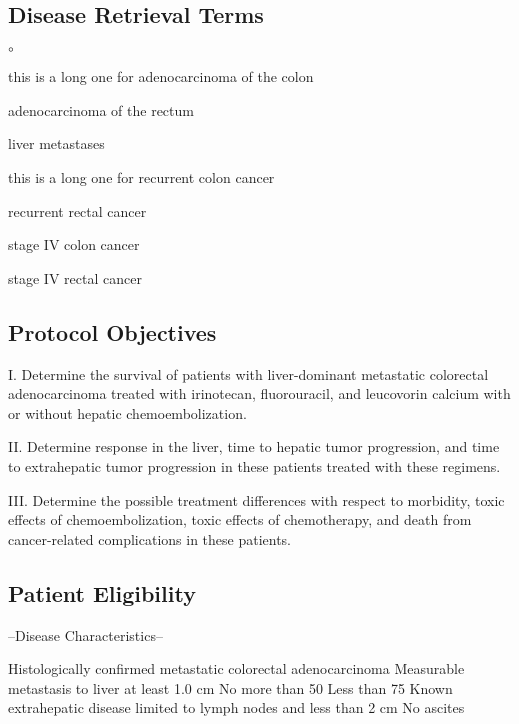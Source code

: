 \documentclass[12pt]{article}
\newcounter{qC}
\begin{document}
\setcounter{qC}{0}
\subsection*{Disease Retrieval Terms}
\begin{list}{$\circ$}{\setlength{\itemsep}{-5pt}}
\item this is a long one for adenocarcinoma of the colon 
\item adenocarcinoma of the rectum 
\item liver metastases            
\item this is a long one for recurrent colon cancer 
\item recurrent rectal cancer     
\item stage IV colon cancer 
\item stage IV rectal cancer      
\end{list}

\setcounter{qC}{0}
\subsection*{Protocol Objectives}
I.  Determine the survival of patients with liver-dominant metastatic colorectal
adenocarcinoma treated with irinotecan, fluorouracil, and leucovorin calcium
with or without hepatic chemoembolization.
                                     
II.  Determine response in the liver, time to hepatic tumor progression, and
time to extrahepatic tumor progression in these patients treated with these
regimens.
                                     
III.  Determine the possible treatment differences with respect to morbidity,
toxic effects of chemoembolization, toxic effects of chemotherapy, and death
from cancer-related complications in these patients.

\setcounter{qC}{0}
\subsection*{Patient Eligibility}                
--Disease Characteristics--

Histologically confirmed metastatic colorectal adenocarcinoma
Measurable metastasis to liver at least 1.0 cm
No more than 50%
Less than 75%
Known extrahepatic disease limited to lymph nodes and less than 2 cm
No ascites
                                     
\end{document}
